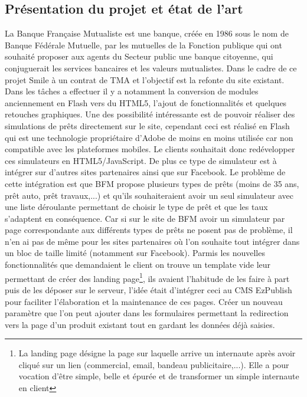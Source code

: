 \documentclass[a4paper,11pt,twoside]{report}
\begin{document}
    \subsection*{Présentation du projet et état de l'art}
    La Banque Française Mutualiste est une banque, créée en 1986 sous le nom de Banque Fédérale Mutuelle, par les mutuelles de la Fonction publique qui ont souhaité proposer aux agents du Secteur public une banque citoyenne, qui conjuguerait les services bancaires et les valeurs mutualistes. Dans le cadre de ce projet Smile à un contrat de TMA et l'objectif est la refonte du site existant. 
    Dans les tâches a effectuer il y a notamment la conversion de modules anciennement en Flash vers du HTML5, l'ajout de fonctionnalités et quelques retouches graphiques. Une des possibilité intéressante est de pouvoir réaliser des simulations de prêts directement sur le site, cependant ceci est réalisé en Flash qui est une technologie propriétaire d'Adobe de moins en moins utilisée car non compatible avec les plateformes mobiles. Le clients souhaitait donc redévelopper ces simulateurs en HTML5/JavaScript. De plus ce type de simulateur est à intégrer sur d'autres sites partenaires ainsi que sur Facebook. Le problème de cette intégration est que BFM propose plusieurs types de prêts (moins de 35 ans, prêt auto, prêt travaux,...) et qu'ils souhaiteraient avoir un seul simulateur avec une liste déroulante permettant de choisir le type de prêt et que les taux s'adaptent en conséquence. Car si sur le site de BFM avoir un simulateur par page correspondante aux différents types de prêts ne posent pas de problème, il n'en ai pas de même pour les sites partenaires où l'on souhaite tout intégrer dans un bloc de taille limité (notamment sur Facebook). 
    Parmis les nouvelles fonctionnalités que demandaient le client on trouve un template vide leur permettant de créer des landing page\footnote{La landing page désigne la page sur laquelle arrive un internaute après avoir cliqué sur un lien (commercial, email, bandeau publicitaire,...). Elle a pour vocation d'être simple, belle et épurée et de transformer un simple internaute en client}, ils avaient l'habitude de les faire à part puis de les déposer sur le serveur, l'idée était d'intégrer ceci au CMS EzPublish pour faciliter l'élaboration et la maintenance de ces pages. Créer un nouveau paramètre que l'on peut ajouter dans les formulaires permettant la redirection vers la page d'un produit existant tout en gardant les données déjà saisies. 
\end{document}
